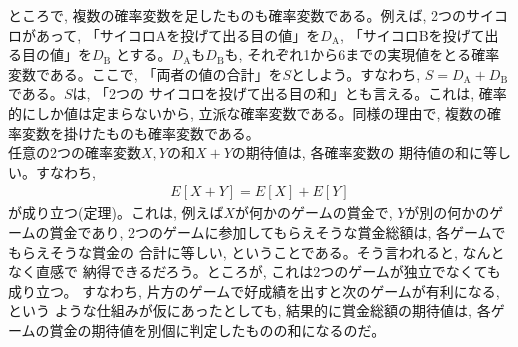 ところで, 複数の確率変数を足したものも確率変数である。例えば, 2つのサイコロがあって, 
「サイコロAを投げて出る目の値」を$D_{\text{A}}$, 「サイコロBを投げて出る目の値」を$D_{\text{B}}$
とする。$D_{\text{A}}$も$D_{\text{B}}$も, それぞれ1から6までの実現値をとる確率変数である。ここで, 
「両者の値の合計」を$S$としよう。すなわち, $S=D_{\text{A}}+D_{\text{B}}$である。$S$は, 「2つの
サイコロを投げて出る目の和」とも言える。これは, 確率的にしか値は定まらないから, 
立派な確率変数である。同様の理由で, 複数の確率変数を掛けたものも確率変数である。\\

任意の2つの確率変数$X, Y$の和$X+Y$の期待値は, 各確率変数の
期待値の和に等しい。すなわち, 
\begin{eqnarray}E[X+Y]=E[X]+E[Y]\label{eq:expect_X_plus_Y}\end{eqnarray}
が成り立つ(定理)。これは, 例えば$X$が何かのゲームの賞金で, $Y$が別の何かのゲームの賞金であり, 
2つのゲームに参加してもらえそうな賞金総額は, 各ゲームでもらえそうな賞金の
合計に等しい, ということである。そう言われると, なんとなく直感で
納得できるだろう。ところが, これは2つのゲームが独立でなくても成り立つ。
すなわち, 片方のゲームで好成績を出すと次のゲームが有利になる, という
ような仕組みが仮にあったとしても, 結果的に賞金総額の期待値は, 
各ゲームの賞金の期待値を別個に判定したものの和になるのだ。

